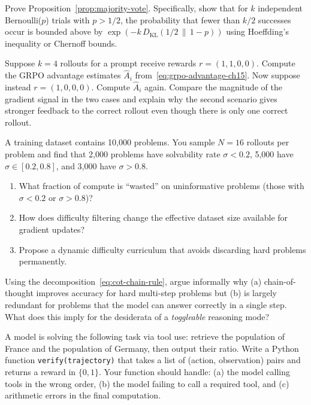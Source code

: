 \begin{exercise}
\label{ex:majority-vote-bound}
Prove Proposition~\ref{prop:majority-vote}. Specifically, show that
for $k$ independent Bernoulli($p$) trials with $p > 1/2$, the
probability that fewer than $k/2$ successes occur is bounded above
by $\exp(-k\,D_{\mathrm{KL}}(1/2\,\|\,1-p))$ using Hoeffding's inequality
or Chernoff bounds.
\end{exercise}

\begin{exercise}
\label{ex:grpo-advantage-ch15}
Suppose $k = 4$ rollouts for a prompt receive rewards $r = (1, 1, 0, 0)$.
Compute the GRPO advantage estimates $\hat{A}_i$ from~\eqref{eq:grpo-advantage-ch15}.
Now suppose instead $r = (1, 0, 0, 0)$. Compute $\hat{A}_i$ again.
Compare the magnitude of the gradient signal in the two cases and
explain why the second scenario gives stronger feedback to the correct
rollout even though there is only one correct rollout.
\end{exercise}

\begin{exercise}
\label{ex:difficulty-filter}
A training dataset contains 10{,}000 problems. You sample $N = 16$
rollouts per problem and find that 2{,}000 problems have solvability
rate $\sigma < 0.2$, 5{,}000 have $\sigma \in [0.2, 0.8]$, and 3{,}000
have $\sigma > 0.8$.
\begin{enumerate}[label=(\alph*)]
\item What fraction of compute is ``wasted'' on uninformative problems
  (those with $\sigma < 0.2$ or $\sigma > 0.8$)?
\item How does difficulty filtering change the effective dataset
  size available for gradient updates?
\item Propose a dynamic difficulty curriculum that avoids discarding
  hard problems permanently.
\end{enumerate}
\end{exercise}

\begin{exercise}
\label{ex:cot-information}
Using the decomposition~\eqref{eq:cot-chain-rule}, argue informally
why (a) chain-of-thought improves accuracy for hard multi-step
problems but (b) is largely redundant for problems that the model can
answer correctly in a single step. What does this imply for the
desiderata of a \emph{toggleable} reasoning mode?
\end{exercise}

\begin{exercise}
\label{ex:tool-calling-reward}
A model is solving the following task via tool use: retrieve the
population of France and the population of Germany, then output their
ratio. Write a Python function \texttt{verify(trajectory)} that takes
a list of (action, observation) pairs and returns a reward in
$\{0, 1\}$. Your function should handle: (a) the model calling tools
in the wrong order, (b) the model failing to call a required tool,
and (c) arithmetic errors in the final computation.
\end{exercise}

